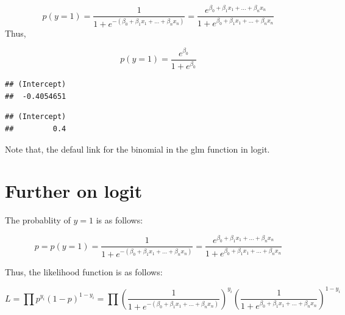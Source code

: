 \documentclass[]{book}
\newenvironment{Shaded}{\begin{snugshade}}{\end{snugshade}}
\newcommand{\DataTypeTok}[1]{\textcolor[rgb]{0.13,0.29,0.53}{#1}}
\newcommand{\DecValTok}[1]{\textcolor[rgb]{0.00,0.00,0.81}{#1}}
\newcommand{\KeywordTok}[1]{\textcolor[rgb]{0.13,0.29,0.53}{\textbf{#1}}}
\newcommand{\NormalTok}[1]{#1}
\newcommand{\OperatorTok}[1]{\textcolor[rgb]{0.81,0.36,0.00}{\textbf{#1}}}
\newcommand{\StringTok}[1]{\textcolor[rgb]{0.31,0.60,0.02}{#1}}
\begin{document}
\[p(y=1)=\frac{1}{1+e^{-(\beta_0+\beta_1x_1+...+\beta_nx_n)}}=\frac{e^{\beta_0+\beta_1x_1+...+\beta_nx_n}}{1+e^{\beta_0+\beta_1x_1+...+\beta_nx_n}}\]
Thus,

\[p(y=1)=\frac{e^{\beta_0}}{1+e^{\beta_0}}\]

\begin{Shaded}
\end{Shaded}

\begin{verbatim}
## (Intercept) 
##  -0.4054651
\end{verbatim}

\begin{Shaded}
\end{Shaded}

\begin{verbatim}
## (Intercept) 
##         0.4
\end{verbatim}

Note that, the defaul link for the binomial in the glm function in logit.

\hypertarget{further-on-logit}{%
\section{Further on logit}\label{further-on-logit}}

The probablity of \(y=1\) is as follows:

\[p=p(y=1)=\frac{1}{1+e^{-(\beta_0+\beta_1x_1+...+\beta_nx_n)}}=\frac{e^{\beta_0+\beta_1x_1+...+\beta_nx_n}}{1+e^{\beta_0+\beta_1x_1+...+\beta_nx_n}}\]

Thus, the likelihood function is as follows:

\[L=\prod p^{y_i}(1-p)^{1-y_i}=\prod (\frac{1}{1+e^{-(\beta_0+\beta_1x_1+...+\beta_nx_n)}})^{y_i}(\frac{1}{1+e^{\beta_0+\beta_1x_1+...+\beta_nx_n}})^{1-y_i}\]
\end{document}
